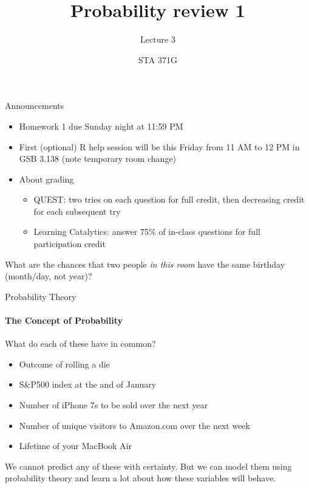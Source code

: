 \documentclass{beamer}\usepackage[]{graphicx}\usepackage[]{color}
\title{Probability review 1}
\subtitle{Lecture 3}
\author{STA 371G}
\begin{document}
\frame{\maketitle}



\begin{darkframes}


\begin{frame}{Announcements}
\begin{itemize}[<+->]
  \item Homework 1 due Sunday night at 11:59 PM
  \item First (optional) R help session will be this Friday from 11 AM to 12 PM in GSB 3.138 (note temporary room change)
  \item About grading
   \begin{itemize}
     \item QUEST: two tries on each question for full credit, then decreasing credit for each subsequent try
     \item Learning Catalytics: answer 75\% of in-class questions for full participation credit
   \end{itemize}
\end{itemize}
\end{frame}

\begin{frame}
\begin{center}
  What are the chances that two people \emph{in this room} have the same birthday (month/day, not year)?
  \lc
\end{center}
\end{frame}

\begin{frame}{Probability Theory}
\framesubtitle{The Concept of Probability}

What do each of these have in common? \pause

\begin{itemize}[<+->]
	\item Outcome of rolling a die
	\item S\&P500 index at the and of January
	\item Number of iPhone 7s to be sold over the next year
	\item Number of unique visitors to Amazon.com over the next week
	\item Lifetime of your MacBook Air
\end{itemize} \pause

We cannot predict any of these with certainty. \pause
But we can model them using \alert{probability theory} and learn a lot about how these variables will behave.
\end{frame}


\end{darkframes}
\end{document}
